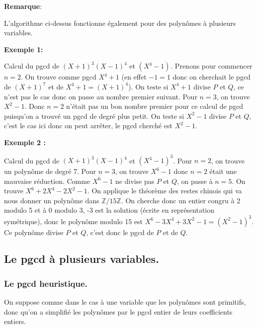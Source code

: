 \documentclass[a4paper,11pt]{article}
\begin{document}
\begin{giacjshere}
{\bf{Remarque}}:

L'algorithme ci-dessus fonctionne également pour des polynômes à plusieurs
variables.

{\bf{Exemple 1:}}

Calcul du pgcd de $( X + 1 )^3 ( X - 1 )^4$ et $( X^4 - 1 )^{}$. Prenons pour
commencer $n = 2$. On trouve comme pgcd $X^4 + 1$ (en effet $- 1 = 1$ donc on
cherchait le pgcd de $( X + 1 )^7$ et de $X^4 + 1 = ( X + 1 )^4$). On teste si
$X^4 + 1$ divise $P$ et $Q$, ce n'est pas le cas donc on passe au nombre
premier suivant. Pour $n = 3$, on trouve $X^2 - 1$. Donc $n = 2$ n'était pas un
bon nombre premier pour ce calcul de pgcd puisqu'on a trouvé un pgcd de degré
plus petit. On teste si $X^2 - 1$ divise $P$ et $Q$, c'est le cas ici donc on
peut arrêter, le pgcd cherché est $X^2-1$.

{\bf{Exemple} 2 :}

Calcul du pgcd de $( X + 1 )^3 ( X - 1 )^4$ et $( X^4 - 1 )^3$. 
Pour $n = 2$, on trouve un polynôme de degré 7.
Pour $n = 3$, on trouve $X^6 - 1$ donc $n = 2$ était une mauvaise réduction.
Comme $X^6 - 1$ ne divise pas $P$ et $Q$, on passe à $n = 5$. On trouve $X^6 +
2 X^4 - 2 X^2 - 1$. On applique le théorème des restes chinois qui va nous
donner un polynôme dans $\mathbb{Z} / 15 \mathbb{Z}$. On cherche donc un
entier congru à 2 modulo 5 et à 0 modulo 3, -3 est la solution (écrite en
représentation symétrique), donc le polynôme modulo 15 est $X^6 - 3 X^4 + 3
X^2 - 1 = ( X^2 - 1 )^3$. Ce polynôme divise $P$ et $Q$, c'est donc le pgcd de
$P$ et de $Q$.

\subsection{Le pgcd à plusieurs variables.}

\subsubsection{Le pgcd heuristique.}

On suppose comme dans le cas à une variable que les polynômes sont primitifs,
donc qu'on a simplifié les polynômes par le pgcd entier de leurs coefficients
entiers.


\end{giacjshere}
\end{document}
